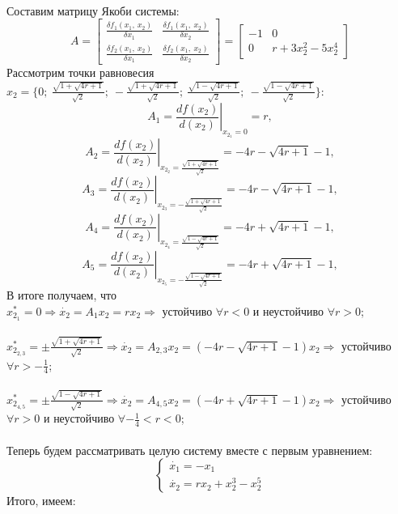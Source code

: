 \documentclass[12pt]{article}
\begin{document}
\ \\
Составим матрицу Якоби системы:
\[
    A = \begin{bmatrix}
\frac{\delta f_1(x_1,\ x_2)}{\delta x_1} & \frac{\delta f_1(x_1,\ x_2)}{\delta x_2}\\
\frac{\delta f_2(x_1,\ x_2)}{\delta x_1} & \frac{\delta f_2(x_1,\ x_2)}{\delta x_2}
\end{bmatrix} = 
\begin{bmatrix}
-1 & 0\\
0 & r + 3x_2^2 - 5x_2^4
\end{bmatrix}
\]
Рассмотрим точки равновесия $x_2 = \{ 0; \ \frac{\sqrt{1+\sqrt{4r+1}}}{\sqrt{2}}; \ -\frac{\sqrt{1+\sqrt{4r+1}}}{\sqrt{2}}; \ \frac{\sqrt{1-\sqrt{4r+1}}}{\sqrt{2}}; \ -\frac{\sqrt{1-\sqrt{4r+1}}}{\sqrt{2}} \}$:
\[
A_1 = \left.\frac{df(x_2)}{d(x_2)}\right|_{x_{2_1} = 0} = r,
\]
\[
A_2 = \left.\frac{df(x_2)}{d(x_2)}\right|_{x_{2_2} = \frac{\sqrt{1+\sqrt{4r+1}}}{\sqrt{2}}} = -4r - \sqrt{4r+1} - 1,
\]
\[
A_3 = \left.\frac{df(x_2)}{d(x_2)}\right|_{x_{2_3} = -\frac{\sqrt{1+\sqrt{4r+1}}}{\sqrt{2}}} = -4r - \sqrt{4r+1} - 1,
\]
\[
A_4 = \left.\frac{df(x_2)}{d(x_2)}\right|_{x_{2_4} = \frac{\sqrt{1-\sqrt{4r+1}}}{\sqrt{2}}} = -4r + \sqrt{4r+1} - 1,
\]
\[
A_5 = \left.\frac{df(x_2)}{d(x_2)}\right|_{x_{2_5} = -\frac{\sqrt{1-\sqrt{4r+1}}}{\sqrt{2}}} = -4r + \sqrt{4r+1} - 1,
\]
В итоге получаем, что \\
$x_{2_1}^* = 0 \Rightarrow \dot{x_2} = A_1 x_2 = r x_2 \Rightarrow$ устойчиво $\forall r<0$ и неустойчиво $\forall r>0$; \\
\ \\
$x_{2_{2,3}}^* = \pm\frac{\sqrt{1+\sqrt{4r+1}}}{\sqrt{2}} \Rightarrow \dot{x_2} = A_{2,3} x_2 = (-4r - \sqrt{4r+1} - 1)x_2 \Rightarrow$ устойчиво $\forall r>-\frac{1}{4}$; \\
\ \\
$x_{2_{4,5}}^* = \pm\frac{\sqrt{1-\sqrt{4r+1}}}{\sqrt{2}} \Rightarrow \dot{x_2} = A_{4,5} x_2 = (-4r + \sqrt{4r+1} - 1)x_2 \Rightarrow$ устойчиво $\forall r>0$ и неустойчиво $\forall -\frac{1}{4}<r<0$; \\
\ \\
Теперь будем рассматривать целую систему вместе с первым уравнением:
\[
\begin{cases}
    \dot{x_1} = -x_1\\
    \dot{x_2} = r x_2 + x_2^3 - x_2^5
\end{cases}
\]
Итого, имеем:
\end{document}
